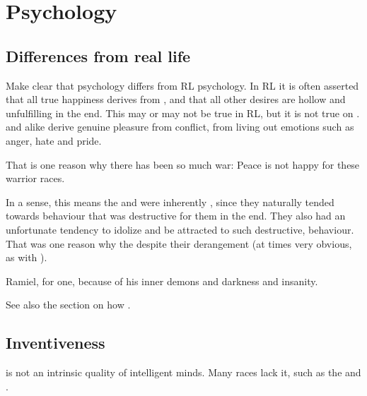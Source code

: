 \section{Psychology}









\subsection{Differences from real life}
Make clear that \Miithian psychology differs from RL psychology.
In RL it is often asserted that all true happiness derives from , and that all other desires are hollow and unfulfilling in the end.
This may or may not be true in RL, but it is not true on \Miith.
\Resphain and \dragons alike derive genuine pleasure from conflict, from living out  emotions such as anger, hate and pride.

That is one reason why there has been so much war:
Peace is not happy for these warrior races.

In a sense, this means the \resphain and \dragons were inherently , since they naturally tended towards behaviour that was destructive for them in the end.
They also had an unfortunate tendency to idolize and be attracted to such destructive,  behaviour.
That was one reason why the  despite their derangement (at times very obvious, as with \Zachirah). 

Ramiel, for one,  because of his inner demons and darkness and insanity.

See also the section on how . 









\subsection{Inventiveness}
 is not an intrinsic quality of intelligent minds. 
Many races lack it, such as the  and . 








